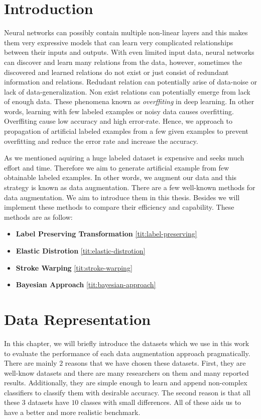 \chapter{Introduction}

Neural networks can possibly contain multiple non-linear layers and this makes them very expressive models
that can learn very complicated relationships between their inputs and outputs. With even limited
input data, neural networks can discover and learn many relations from the data, however, sometimes the
discovered and learned relations do not exist or just consist of redundant information and
relations. Redudant relation can potentially arise of data-noise or lack of data-generalization. Non
exist relations can potentially emerge from lack of enough data. These phenomena known as
\textit{overffiting} in deep learning. In other words, learning with few labeled examples or noisy
data causes overfitting. Overffiting cause low accuracy and high error-rate. Hence, we approach to propagation of artificial
labeled examples from a few given examples to prevent overfitting and reduce the error rate and increase
the accuracy.

As we mentioned aquiring a huge labeled dataset is expensive and seeks much effort and time. Therefore we aim to generate artificial example from few obtainable labeled examples. In other words, we
augment our data and this strategy is known as data augmentation. There are a few well-known methods for data augmentation. We aim to introduce them in this thesis.  Besides we will implement these
methods to compare their efficiency and capability. These methods are as follow:
\begin{itemize}
  \item \textbf{Label Preserving Transformation} \ref{tit:label-preserving}
  \item \textbf{Elastic Distrotion} \ref{tit:elastic-distrotion}
  \item \textbf{Stroke Warping} \ref{tit:stroke-warping}
  \item \textbf{Bayesian Approach} \ref{tit:bayesian-approach}
\end{itemize}



\chapter{Data Representation}
\label{tit:data-representation}
In this chapter, we will briefly introduce the datasets which we use in this work to evaluate the
performance of each data augmentation approach pragmatically. There are mainly $2$ reasons that we
have chosen these datasets. First, they are well-know datasets and there are many researchers on
them and many reported results. Additionally, they are simple enough to learn and append non-complex
classifiers to classify them with desirable accuracy. The second reason is that all these $3$
datasets have $10$ classes with small differences. All of these aids us to have a better and more
realistic benchmark.

